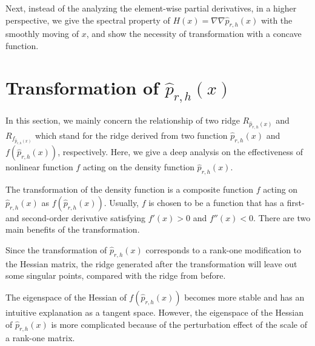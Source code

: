 \documentclass[aos,preprint]{imsart}
\theoremstyle{remark}
\begin{document}
Next, instead of the analyzing the element-wise partial derivatives, in a higher perspective, we give the spectral property of $H(x) = \nabla\nabla \hat{p}_{r,h}(x)$ with the smoothly moving of $x$, and show the necessity of transformation with a concave function.

\section{Transformation of $\hat{p}_{r,h}(x)$}
In this section, we mainly concern the relationship of two ridge $R_{\hat{p}_{r,h}(x)}$ and $R_{f_{\hat{p}_{r,h}(x)}}$ which stand for the ridge derived from two function $\hat{p}_{r,h}(x)$ and  $f( \hat{p}_{r,h}(x))$, respectively. Here, we give a deep analysis on the effectiveness of nonlinear function $f$ acting on the density function $\hat{p}_{r,h}(x)$.

The transformation of the density function is a composite function $f$ acting on $\hat{p}_{r,h}(x)$ as $f( \hat{p}_{r,h}(x))$. Usually, $f$ is chosen to be a function that has a first- and second-order derivative satisfying $f'(x)>0$ and $f''(x)<0$. There are two main benefits of the transformation.

Since the transformation of $\hat{p}_{r,h}(x)$ corresponds to a rank-one modification to the Hessian matrix, the ridge generated after the transformation will leave out some singular points, compared with the ridge from before.

The eigenspace of the Hessian of $f( \hat{p}_{r,h}(x))$ becomes more stable and has an intuitive explanation as a tangent space. However, the eigenspace of the Hessian of $\hat{p}_{r,h}(x)$ is more complicated because of the perturbation effect of the scale of a rank-one matrix.
\end{document}
